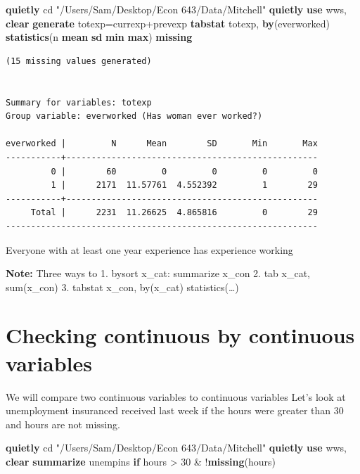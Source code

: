 \documentclass[
]{book}
\newenvironment{Shaded}{\begin{snugshade}}{\end{snugshade}}
\newcommand{\FunctionTok}[1]{\textcolor[rgb]{0.13,0.29,0.53}{\textbf{#1}}}
\newcommand{\KeywordTok}[1]{\textcolor[rgb]{0.13,0.29,0.53}{\textbf{#1}}}
\newcommand{\NormalTok}[1]{#1}
\newcommand{\StringTok}[1]{\textcolor[rgb]{0.31,0.60,0.02}{#1}}
\begin{document}
\begin{Shaded}
\begin{Highlighting}[]
\KeywordTok{quietly}\NormalTok{ cd }\StringTok{"/Users/Sam/Desktop/Econ 643/Data/Mitchell"}
\KeywordTok{quietly} \KeywordTok{use}\NormalTok{ wws, }\KeywordTok{clear}
\KeywordTok{generate}\NormalTok{ totexp=currexp+prevexp}
\KeywordTok{tabstat}\NormalTok{ totexp, }\KeywordTok{by}\NormalTok{(everworked) }\KeywordTok{statistics}\NormalTok{(n }\KeywordTok{mean} \FunctionTok{sd} \FunctionTok{min} \FunctionTok{max}\NormalTok{) }\FunctionTok{missing}
\end{Highlighting}
\end{Shaded}

\begin{verbatim}
(15 missing values generated)


Summary for variables: totexp
Group variable: everworked (Has woman ever worked?)

everworked |         N      Mean        SD       Min       Max
-----------+--------------------------------------------------
         0 |        60         0         0         0         0
         1 |      2171  11.57761  4.552392         1        29
-----------+--------------------------------------------------
     Total |      2231  11.26625  4.865816         0        29
--------------------------------------------------------------
\end{verbatim}

Everyone with at least one year experience has experience working

\textbf{Note:}
Three ways to
1. bysort x\_cat: summarize x\_con
2. tab x\_cat, sum(x\_con)
3. tabstat x\_con, by(x\_cat) statistics(\ldots)

\section{Checking continuous by continuous variables}\label{checking-continuous-by-continuous-variables}

We will compare two continuous variables to continuous variables Let's look at unemployment insuranced received last week if the hours were greater than 30 and hours are not missing.

\begin{Shaded}
\begin{Highlighting}[]
\KeywordTok{quietly}\NormalTok{ cd }\StringTok{"/Users/Sam/Desktop/Econ 643/Data/Mitchell"}
\KeywordTok{quietly} \KeywordTok{use}\NormalTok{ wws, }\KeywordTok{clear}
\KeywordTok{summarize}\NormalTok{ unempins }\KeywordTok{if}\NormalTok{ hours \textgreater{} 30 \& !}\FunctionTok{missing}\NormalTok{(hours)}
\end{Highlighting}
\end{Shaded}
\end{document}

